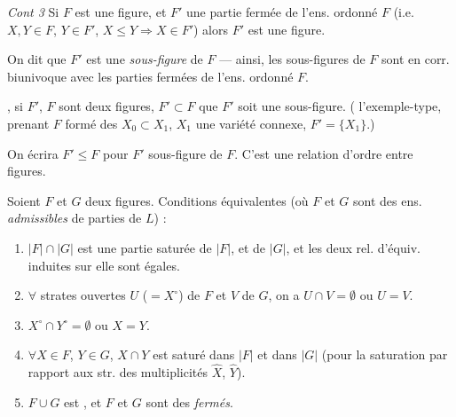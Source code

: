 \documentclass[11pt,a4paper]{article}
\begin{document}

\emph{Cont 3} \quad Si $F$ est une \struck{\ill{}} figure, et $F'$ une partie fermée de l'ens. ordonné $F$ (i.e. $X, Y \in F$, $Y \in F'$, $X \leq Y \Rightarrow X \in F'$) alors $F'$ est une figure.

On dit que $F'$ est une \emph{sous-figure} de $F$ — ainsi, les sous-figures de $F$ sont en corr. biunivoque avec les parties fermées de l'ens. ordonné $F$.

, si $F'$, $F$ sont deux figures, $F' \subset F$ \ill{} que $F'$ soit une sous-figure. (\ill{} l'exemple-type, prenant $F$ formé des $X_0 \subset X_1$, $X_1$ une variété connexe, $F' = \{X_1\}$.)

On écrira  $F' \leq F$ pour $F'$ sous-figure de $F$. C'est une relation d'ordre entre figures.


Soient $F$ et $G$ deux figures. Conditions équivalentes (où $F$ et $G$ sont des ens. \emph{admissibles} de parties de $L$) :
\begin{enumerate}
  \item[a)] $|F| \cap |G|$ est une partie saturée de $|F|$, et de $|G|$, et les deux rel. d'équiv. induites sur elle sont égales.
  \item[b)] $\forall$ strates ouvertes $U$ ($= X^{\circ}$) de $F$ et $V$ de $G$, on a $U \cap V = \emptyset$ ou $U = V$.
  \item[b')] \struck{\ill{}} $X^{\circ} \cap Y^{\circ} = \emptyset$ ou $X = Y$.
  \item[c)] $\forall X \in F$, $Y \in G$, $X \cap Y$ est saturé dans $|F|$ et dans $|G|$ (pour la saturation \ill{} par rapport aux str. \ill{} des multiplicités $\widehat{X}$, $\widehat{Y}$).
  \item[d)] $F \cup G$ est , et $F$ et $G$ sont des \ill{} \emph{fermés}.
\end{enumerate}
\end{document}

